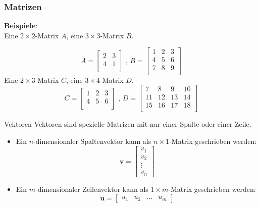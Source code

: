 \documentclass{beamer}
\begin{document}
\begin{frame}
    \frametitle{Matrizen}
  \textbf{Beispiele}:\\
   Eine $2 \times 2$-Matrix $A$, eine $3 \times 3$-Matrix $B$. 
  
  \[ 
  A = \begin{bmatrix}
    2 & 3 \\
    4 & 1 \\
  \end{bmatrix}
  \text{ , }
  B = \begin{bmatrix}
    1 & 2 & 3 \\
    4 & 5 & 6 \\
    7 & 8 & 9 \\
  \end{bmatrix}
  \]
  Eine $2 \times 3$-Matrix $C$, eine $3 \times 4$-Matrix $D$.
  \[
C = \begin{bmatrix}
    1 & 2 & 3 \\
    4 & 5 & 6 \\
\end{bmatrix}
\text{ , }
D = \begin{bmatrix}
    7 & 8 & 9 & 10 \\
    11 & 12 & 13 & 14 \\
    15 & 16 & 17 & 18 \\
\end{bmatrix}
\]
\end{frame}

\begin{frame}{Vektoren}
  Vektoren sind spezielle Matrizen mit nur einer Spalte oder einer Zeile.
  \begin{itemize}
  
    \item Ein \(n\)-dimensionaler Spaltenvektor kann als \(n \times 1\)-Matrix geschrieben werden:
      \[
        \mathbf{v} = \begin{bmatrix} v_1 \\ v_2 \\ \vdots \\ v_n \end{bmatrix}
      \]
    \item Ein \(m\)-dimensionaler Zeilenvektor kann als \(1 \times m\)-Matrix geschrieben werden:
      \[
        \mathbf{u} = \begin{bmatrix} u_1 & u_2 & \ldots & u_m \end{bmatrix}
      \]
  \end{itemize}
\end{frame}
\end{document}

